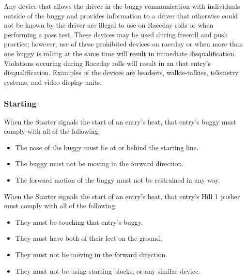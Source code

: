 	Any device that allows the driver in the buggy communication with individuals outside of the buggy and provides information to a driver that otherwise could not be known by the driver are illegal to use on Raceday rolls or when performing a pass test. These devices may be used during freeroll and push practice; however, use of these prohibited devices on raceday or when more than one buggy is rolling at the same time will result in immediate disqualification. Violations occuring during Raceday rolls will result in an that entry's disqualification. Examples of the devices are headsets, walkie-talkies, telemetry systems, and video display units.

\subsubsection{Starting}

	When the Starter signals the start of an entry's heat, that entry's buggy must comply with all of the following:

	\begin{itemize}

		\item The nose of the buggy must be at or behind the starting line.

		\item The buggy must not be moving in the forward direction.

		\item The forward motion of the buggy must not be restrained in any way.

	\end{itemize}

	\noindent When the Starter signals the start of an entry's heat, that entry's Hill 1 pusher must comply with all of the following:

	\begin{itemize}

		\item They must be touching that entry's buggy.

		\item They must have both of their feet on the ground.

		\item They must not be moving in the forward direction.

		\item They must not be using starting blocks, or any similar device.

	\end{itemize}

